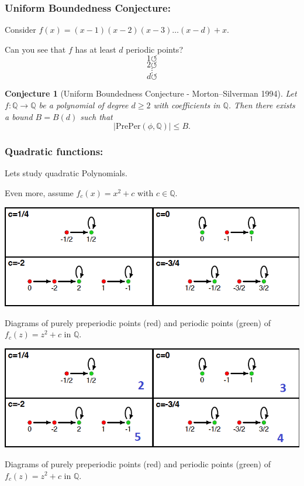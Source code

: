 \documentclass{beamer}
\def\QQ{{\mathbb Q}}
\theoremstyle{thmstyle}
\theoremstyle{thmstyle}
\theoremstyle{thmstyle}
\theoremstyle{mystyle}
\newtheorem*{conjecture}{Conjecture}
\theoremstyle{qstnstyle}
\begin{document}
\begin{frame}
\frametitle{Uniform Boundedness Conjecture:}
Consider $f(x)=(x-1)(x-2)(x-3)\ldots(x-d)+x$.

Can you see that $f$ has at least $d$ periodic points? 
\pause 
$$1 \circlearrowleft  $$
$$2 \circlearrowleft  $$
$$\vdots  $$
$$d \circlearrowleft  $$

\pause

\begin{conjecture}[Uniform Boundedness Conjecture - Morton--Silverman
  1994]
Let $f:\QQ \to \QQ$ be a polynomial of degree $d\geq 2$ with coefficients in $\QQ$. Then there exists a bound $B = B(d)$ such that 
$$|\text{PrePer}(\phi,\QQ)| \leq B.$$
\end{conjecture}
\end{frame}

\begin{frame}
\frametitle{Quadratic functions:}

Lets study quadratic Polynomials.

\vspace{10mm}

Even more, assume $f_c(x)=x^2+c$ with $c\in\QQ$.


\end{frame}


\begin{frame}
\begin{center}
\includegraphics[width=1.0\linewidth]{placeholder}
\end{center}
Diagrams of purely preperiodic points (red) and periodic points (green) of  $f_c(z)=z^2+c$ in $\QQ$.
\end{frame}

\begin{frame}
\begin{center}
\includegraphics[width=1.0\linewidth]{placeholderNumber}
\end{center}
Diagrams of purely preperiodic points (red) and periodic points (green) of  $f_c(z)=z^2+c$ in $\QQ$.
\end{frame}
\end{document}
